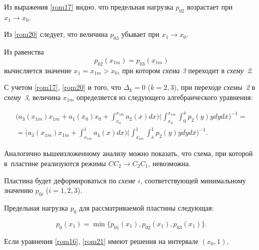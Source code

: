Из выражения \eqref{rom17} видно, что предельная нагрузка $p_{02}$ возрастает при ${x_1\to x_0}$.

Из \eqref{rom20} следует, что величина $p_{03}$ убывает при ${x_1\to x_0}$.

Из равенства $$p_{02}(x_{1m})=p_{03}(x_{1m})$$ вычисляется значение $x_1=x_{1m}>x_0$, при котором {\sl схема 3} переходит в {\sl схему~2}.

С учетом \eqref{rom17}, \eqref{rom20} и того, что $\Delta_k=0$ ($k=2, 3$), при переходе {\sl схемы~2} в {\sl схему~3}, величина $x_{1m}$ определяется из следующего алгебраического  уравнения:

\begin{multline}

\label{rom21}

\biggl(

a_3(x_{1m})x_{1m}+a_1(x_0)x_0+\int_{x_0}^{x_{1m}}{a_2(x)}dx\biggr)

\biggl( \int_{x_0}^{x_{1m}}  \int_0^{\bar{x}} p_2(y)y dy  d\bar{x}\biggr)^{-1}=\\

=

\biggl(

a_3(x_{1m})x_{1m}+\int_{x_{1m}}^1 a_4(x)dx \biggr)

\biggl(

\int_{x_{1m}}^1  \int_{\bar{x}}^1{p_2(y)y}dy  d\bar{x}\biggr)^{-1}.

\end{multline}



Аналогично вышеизложенному анализу можно показать, что схема, при которой в~пластине реализуются режимы $CC_2\to C_2C_1$, невозможна.



Пластина будет деформироваться по {\sl схеме $i$}, соответствующей минимальному значению $p_{0i}$ ($i=1, 2, 3$).

Предельная нагрузка $p_0$ для рассматриваемой пластины следующая:

\begin{equation}

\label{rom22}

p_0(x_1)=\min\bigl\{p_{01}(x_1),p_{02}(x_1),p_{03}(x_1)\bigr\}.

\end{equation}



Если уравнения \eqref{rom16}, \eqref{rom21} имеют решения на интервале $(x_0, 1)$,

